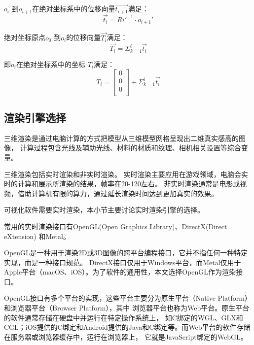 $o_i$ 到$o_{i+1}$在绝对坐标系中的位移向量$\vec{t_{i+1}}$满足：
    \begin{equation}
    \vec{t_i} = Ri'^{-1}\cdot o_{i+1}'
    \end{equation}

绝对坐标原点$o_0$ 到$o_i$的位移向量$\vec{T_i}$满足：
    \begin{equation}
    \vec{T_i} = \Sigma_{k=1} ^ {i} \vec{t_i}
    \end{equation}

即$o_i$在绝对坐标系中的坐标 $T_i$满足\cite{用于光纤光栅曲线重建算法的坐标点拟合}：
\begin{equation}
T_i = \left[
    \begin{matrix}
    0\\
    0\\
    0\\
  	\end{matrix}
  \right]
  + \Sigma_{k=1} ^ {i} \vec{t_i}
\end{equation}

\subsection{渲染引擎选择}
\label{sec:render}

三维渲染是通过电脑计算的方式把模型从三维模型网格呈现出二维真实感高的图像\cite{3DModels_SurveyPaper}，
计算过程包含光线及辅助光线、材料的材质和纹理、相机相关设置等综合变量\cite{scientce-of-3d-rendering}。

三维渲染包括实时渲染和非实时渲染。
实时渲染主要应用在游戏领域，电脑会实时的计算和展示所渲染的结果，帧率在20-120左右。
非实时渲染通常是电影或视频，借助计算机有限的算力，通过延长渲染时间达到更加真实的效果。

可视化软件需要实时渲染，本小节主要讨论实时渲染引擎的选择。

常用的实时渲染接口有OpenGL(Open Graphics Library)\cite{opengl}、DirectX(Direct eXtension)\cite{directx}
和Metal\cite{metal}。

OpenGL是一种用于渲染2D或3D图像的跨平台编程接口\cite{opengl}，它并不指任何一种特定实现，而是一种接口规范。
DirectX接口仅用于Windows平台，而Metal仅用于Apple平台（macOS、iOS）。为了软件的通用性，本文选择OpenGL作为渲染接口。

OpenGL接口有多个平台的实现，这些平台主要分为原生平台（Native Platform）和浏览器平台（Browser Platform），其中
浏览器平台也称为Web平台。原生平台的软件通常存储在硬盘中并运行在特定操作系统上，
如C绑定的WGL、GLX和CGL；iOS提供的C绑定和Android提供的Java和C绑定等。而Web平台的软件存储在服务器或浏览器缓存中，运行在浏览器上，
它就是JavaScript绑定的WebGL。

